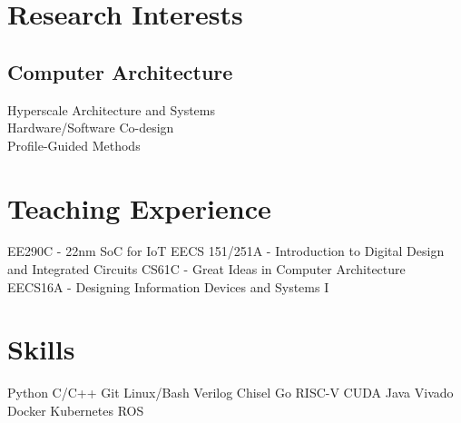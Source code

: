 \documentclass[]{deedy-resume-openfont}
\begin{document}
\begin{minipage}[t]{0.33\textwidth}

\section{Research Interests}
\subsection{Computer Architecture}

Hyperscale Architecture and Systems \\ 
Hardware/Software Co-design \\
Profile-Guided Methods

\smallsectionsep



\section{Teaching Experience}

EE290C - 22nm SoC for IoT \textbullet{} 
EECS 151/251A -  Introduction to Digital Design
and Integrated Circuits \textbullet{}
CS61C - Great Ideas in Computer Architecture \textbullet{}
EECS16A - Designing Information Devices and Systems I

\smallsectionsep


\section{Skills}
Python \textbullet{} C/C++ \textbullet{} Git \textbullet{} Linux/Bash \textbullet{} Verilog \textbullet{} Chisel \textbullet{} Go \textbullet{} RISC-V \textbullet{} CUDA \textbullet{} Java \textbullet{} Vivado \textbullet{} Docker \textbullet{} Kubernetes \textbullet{} ROS %
\smallsectionsep




\end{minipage}
\end{document}

